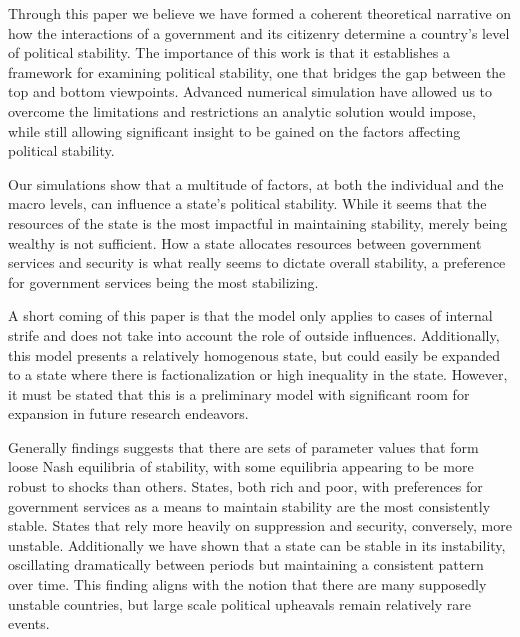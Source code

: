 \documentclass[12pt]{article}
\begin{document}
\begin{spacing}{1.5}




Through this paper we believe we have formed a coherent theoretical narrative on how the interactions of a government and its citizenry determine a country's level of political stability. The importance of this work is that it establishes a framework for examining political stability, one that bridges the gap between the top and bottom viewpoints. Advanced numerical simulation have allowed us to overcome the limitations and restrictions an analytic solution would impose, while still allowing significant insight to be gained on the factors affecting political stability. 
 
Our simulations show that a multitude of factors, at both the individual and the macro levels, can influence a state’s political stability. While it seems that the resources of the state is the most impactful in maintaining stability, merely being wealthy is not sufficient. How a state allocates resources between government services and security is what really seems to dictate overall stability, a preference for government services being the most stabilizing. 
 
A short coming of this paper is that the model only applies to cases of internal strife and does not take into account the role of outside influences. Additionally, this model presents a relatively homogenous state, but could easily be expanded to a state where there is factionalization or high inequality in the state. However, it must be stated that this is a preliminary model with significant room for expansion in future research endeavors. 
 
Generally findings suggests that there are sets of parameter values that form loose Nash equilibria of stability, with some equilibria appearing to be more robust to shocks than others. States, both rich and poor, with preferences for government services as a means to maintain stability are the most consistently stable. States that rely more heavily on suppression and security, conversely, more unstable. Additionally we have shown that a state can be stable in its instability, oscillating dramatically between periods but maintaining a consistent pattern over time. This finding aligns with the notion that there are many supposedly unstable countries, but large scale political upheavals remain relatively rare events. 
 


\end{spacing}
\end{document}
